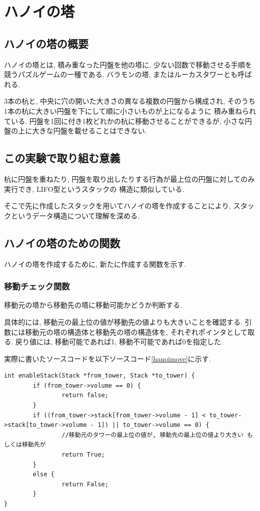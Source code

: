 \documentclass[a4j]{jsarticle}
\begin{document}
\section{ハノイの塔}
    \subsection{ハノイの塔の概要}
        ハノイの塔とは, 積み重なった円盤を他の塔に, 少ない回数で移動させる手順を競うパズルゲームの一種である. 
        バラモンの塔, またはルーカスタワーとも呼ばれる. 
        
        3本の杭と, 中央に穴の開いた大きさの異なる複数の円盤から構成され, そのうち1本の杭に大きい円盤を下にして順に小さいものが上になるように
        積み重ねられている. 円盤を1回に付き1枚どれかの杭に移動させることができるが, 小さな円盤の上に大きな円盤を載せることはできない. 
    \subsection{この実験で取り組む意義}
        杭に円盤を重ねたり, 円盤を取り出したりする行為が最上位の円盤に対してのみ実行でき, LIFO型というスタックの
        構造に類似している. 
        
        そこで先に作成したスタックを用いてハノイの塔を作成することにより, スタックというデータ構造について理解を深める. 
    \subsection{ハノイの塔のための関数}
        ハノイの塔を作成するために, 新たに作成する関数を示す. 
        \subsubsection{移動チェック関数}
        移動元の塔から移動先の塔に移動可能かどうか判断する. 
        
        具体的には, 移動元の最上位の値が移動先の値よりも大きいことを確認する. 
        引数には移動元の塔の構造体と移動先の塔の構造体を, それぞれポインタとして取る. 戻り値には, 移動可能であれば1, 移動不可能であれば0を指定した. 
        
        実際に書いたソースコードを以下ソースコード\ref{hanoimove}に示す. 
        \begin{lstlisting}[label = hanoimove, caption = 移動チェック関数]
int enableStack(Stack *from_tower, Stack *to_tower) {
        if (from_tower->volume == 0) {
                return false;
        }
        if ((from_tower->stack[from_tower->volume - 1] < to_tower->stack[to_tower->volume - 1]) || to_tower->volume == 0) {
                //移動元のタワーの最上位の値が, 移動先の最上位の値より大きい もしくは移動先が
                return True;
        }
        else {
                return False;
        }
}
        \end{lstlisting}
\end{document}
